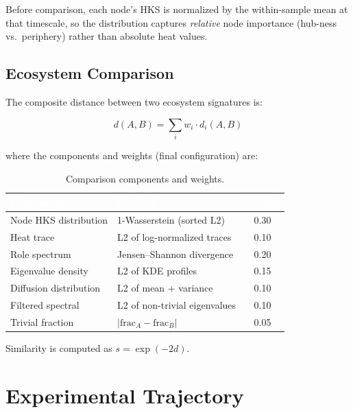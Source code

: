\documentclass{../yalumba}
\begin{document}
Before comparison, each node's HKS is normalized by the within-sample mean at
that timescale, so the distribution captures \emph{relative} node importance
(hub-ness vs.\ periphery) rather than absolute heat values.

\subsection{Ecosystem Comparison}

The composite distance between two ecosystem signatures is:

\begin{equation}
  d(A, B) = \sum_{i} w_i \cdot d_i(A, B)
  \label{eq:composite}
\end{equation}

where the components and weights (final configuration) are:

\begin{table}[H]
  \centering
  \tablestyle
  \caption{Comparison components and weights.}
  \label{tab:weights}
  \begin{tabular}{llc}
    \toprule
    \rowcolor{table-header}
    \textcolor{white}{\textbf{Component}} &
    \textcolor{white}{\textbf{Method}} &
    \textcolor{white}{\textbf{Weight}} \\
    \midrule
    Node HKS distribution & 1-Wasserstein (sorted L2) & 0.30 \\
    Heat trace & L2 of log-normalized traces & 0.10 \\
    Role spectrum & Jensen--Shannon divergence & 0.20 \\
    Eigenvalue density & L2 of KDE profiles & 0.15 \\
    Diffusion distribution & L2 of mean + variance & 0.10 \\
    Filtered spectral & L2 of non-trivial eigenvalues & 0.10 \\
    Trivial fraction & $|\text{frac}_A - \text{frac}_B|$ & 0.05 \\
    \bottomrule
  \end{tabular}
\end{table}

Similarity is computed as $s = \exp(-2d)$.


\section{Experimental Trajectory}
\label{sec:experiments}
\end{document}
